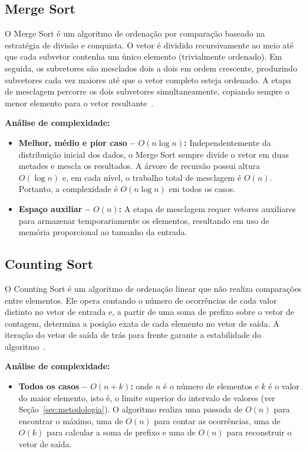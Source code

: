 \documentclass[12pt]{article}
\begin{document}
\subsection{Merge Sort}

O Merge Sort é um algoritmo de ordenação por comparação baseado na estratégia
de divisão e conquista. O vetor é dividido recursivamente ao meio até que cada
subvetor contenha um único elemento (trivialmente ordenado). Em seguida, os
subvetores são mesclados dois a dois em ordem crescente, produzindo subvetores
cada vez maiores até que o vetor completo esteja ordenado. A etapa de
mesclagem percorre os dois subvetores simultaneamente, copiando sempre o
menor elemento para o vetor resultante~\cite{gfg-merge}.

\textbf{Análise de complexidade:}
\begin{itemize}
  \item \textbf{Melhor, médio e pior caso -- $O(n \log n)$:}
    Independentemente da distribuição inicial dos dados, o Merge Sort sempre
    divide o vetor em duas metades e mescla os resultados. A árvore de
    recursão possui altura $O(\log n)$ e, em cada nível, o trabalho total
    de mesclagem é $O(n)$. Portanto, a complexidade é $O(n \log n)$ em
    todos os casos.
  \item \textbf{Espaço auxiliar -- $O(n)$:} A etapa de mesclagem requer
    vetores auxiliares para armazenar temporariamente os elementos,
    resultando em uso de memória proporcional ao tamanho da entrada.
\end{itemize}

\subsection{Counting Sort}

O Counting Sort é um algoritmo de ordenação linear que não realiza
comparações entre elementos. Ele opera contando o número de ocorrências de
cada valor distinto no vetor de entrada e, a partir de uma soma de prefixo
sobre o vetor de contagem, determina a posição exata de cada elemento no
vetor de saída. A iteração do vetor de saída de trás para frente garante a
estabilidade do algoritmo~\cite{gfg-counting}.

\textbf{Análise de complexidade:}
\begin{itemize}
  \item \textbf{Todos os casos -- $O(n + k)$:} onde $n$ é o número de
    elementos e $k$ é o valor do maior elemento, isto é, o limite superior
    do intervalo de valores (ver Seção~\ref{sec:metodologia}).
    O algoritmo realiza uma passada de $O(n)$ para encontrar o máximo, uma
    de $O(n)$ para contar as ocorrências, uma de $O(k)$ para calcular a
    soma de prefixo e uma de $O(n)$ para reconstruir o vetor de saída.
\end{itemize}
\end{document}
